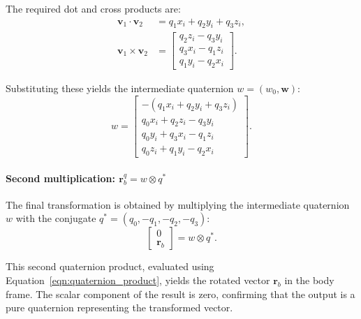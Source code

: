 The required dot and cross products are:
\begin{align}
\bm{v}_1 \cdot \bm{v}_2 &= q_1 x_i + q_2 y_i + q_3 z_i, \\
\bm{v}_1 \times \bm{v}_2 &= 
\begin{bmatrix}
q_2 z_i - q_3 y_i \\
q_3 x_i - q_1 z_i \\
q_1 y_i - q_2 x_i
\end{bmatrix}.
\end{align}

Substituting these yields the intermediate quaternion $w = (w_0, \bm{w})$:
\begin{equation}
w = 
\begin{bmatrix}
-(q_1 x_i + q_2 y_i + q_3 z_i) \\
q_0 x_i + q_2 z_i - q_3 y_i \\
q_0 y_i + q_3 x_i - q_1 z_i \\
q_0 z_i + q_1 y_i - q_2 x_i
\end{bmatrix}.
\label{eqn:intermediate_w}
\end{equation}

\paragraph{Second multiplication: $\bm{r}_b^q = w \otimes q^*$}

The final transformation is obtained by multiplying the intermediate quaternion $w$ with the conjugate $q^* = (q_0, -q_1, -q_2, -q_3)$:
\begin{equation}
\begin{bmatrix} 0 \\ \bm{r}_b \end{bmatrix} = w \otimes q^*.
\label{eqn:final_step}
\end{equation}

This second quaternion product, evaluated using Equation~\ref{eqn:quaternion_product}, yields the rotated vector $\bm{r}_b$ in the body frame. The scalar component of the result is zero, confirming that the output is a pure quaternion representing the transformed vector.




